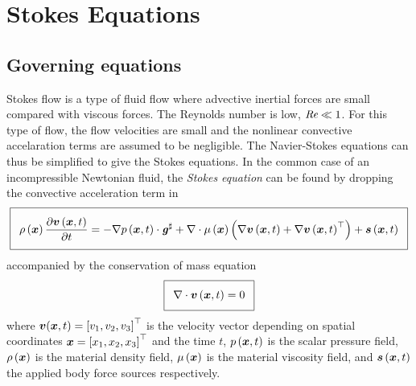 \section{Stokes Equations}
\label{sec:StokesEquations}

\subsection{Governing equations}

Stokes flow is a type of fluid flow where advective inertial forces are small
compared with viscous forces. The Reynolds number is low, \ie
$  \textit{Re}  \ll 1$. For this type of flow, the flow velocities are small and
the nonlinear convective accelaration terms are assumed to be negligible. The
Navier-Stokes equations can thus be simplified to give the Stokes
equations. In the common case of an incompressible Newtonian fluid, the
\emph{Stokes equation} can be found by dropping the convective acceleration
term in  \ie
\begin{equation}
  \addtolength{\fboxsep}{5pt}
  \boxed{
    \fnof{\rho}{\vectr{x}}\delby{\fnof{\vectr{v}}{\vectr{x},t}}{t}=
    \dotprod{-\gradient{}{\fnof{p}{\vectr{x},t}}}{\sharptensor{\tensor{g}}}
    +\divergence{}{\fnof{\mu}{\vectr{x}}\pbrac{\gradient{}{\fnof{\vectr{v}}{\vectr{x},t}+
          \transpose{\gradient{}{\fnof{\vectr{v}}{\vectr{x},t}}}}}}
    +\fnof{\vectr{s}}{\vectr{x},t}
  }
  \label{eqn:StokesEquationMomentum}
\end{equation}
accompanied by the conservation of mass equation
\begin{equation}
  \addtolength{\fboxsep}{5pt}
  \boxed{
    \divergence{}{\fnof{\vectr{v}}{\vectr{x},t}}=0
  }
  \label{eqn:StokesEquationMass}
\end{equation}
where $ \boldsymbol{v} ( \boldsymbol{x} ,t)= {\left[ v_1,v_2,v_3 \right]}^{ \top } $ is the
velocity vector depending on spatial coordinates
$ \boldsymbol{x} = {\left[ x_1,x_2,x_3 \right]}^{ \top } $ and the time $t$,
$ p\left(  \boldsymbol{x} ,t \right) $ is the scalar pressure field,
$ \rho\left(  \boldsymbol{x}  \right) $ is the material density field,
$ \mu\left(  \boldsymbol{x}  \right) $ is the material viscosity field, and
$  \boldsymbol{s} \left(  \boldsymbol{x} ,t \right) $ the applied body force sources respectively.

